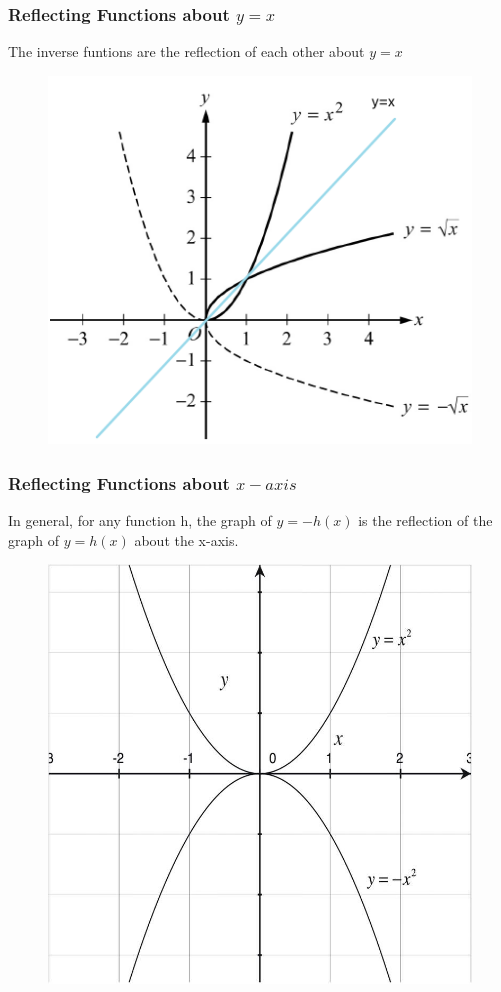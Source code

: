 \documentclass[
	11pt, %
	handout,
]{beamer}
\begin{document}
\begin{frame}
	\frametitle{Reflecting Functions about $y = x$}
	\begin{theorem}[调换xy]
	The inverse funtions are the reflection of each other about $y = x$
	\end{theorem}

	\begin{figure}
		\includegraphics[width=0.5\linewidth]{Reflection1.png} 
	\end{figure}

\end{frame}



\begin{frame}
	\frametitle{Reflecting Functions about $x-axis$}
	\begin{theorem}[函数右边加负号]
	In general, for any function h, the graph of $y = −h(x)$ is the reflection of the graph of $y = h(x)$ about the x-axis.
	\end{theorem}

	\begin{figure}
		\includegraphics[width=0.5\linewidth]{Reflection2.jpeg} 
	\end{figure}

\end{frame}
\end{document}
